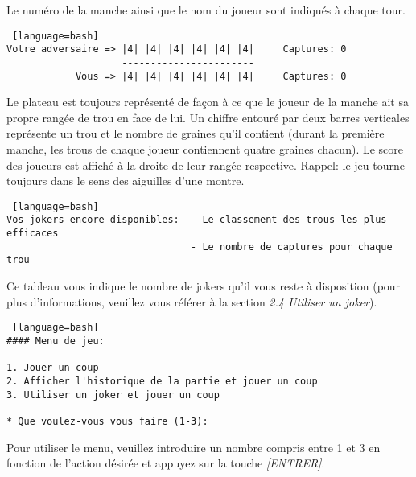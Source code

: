 \documentclass[11pt,a4paper]{report}
\begin{document}
            \begin{flushleft}
            Le numéro de la manche ainsi que le nom du joueur sont indiqués à chaque tour.
            \end{flushleft}

\begin{lstlisting} [language=bash]
Votre adversaire => |4| |4| |4| |4| |4| |4|     Captures: 0
                    -----------------------
            Vous => |4| |4| |4| |4| |4| |4|     Captures: 0
\end{lstlisting}

            \begin{flushleft}
            Le plateau est toujours représenté de façon à ce que le joueur de la manche ait sa propre rangée de trou en face de lui. Un chiffre entouré par deux barres verticales représente un trou et le nombre de graines qu'il contient (durant la première manche, les trous de chaque joueur contiennent quatre graines chacun). Le score des joueurs est affiché à la droite de leur rangée respective.\newline
            \underline{Rappel:} le jeu tourne toujours dans le sens des aiguilles d’une montre.
            \end{flushleft}

\begin{lstlisting} [language=bash]
Vos jokers encore disponibles:  - Le classement des trous les plus efficaces
                                - Le nombre de captures pour chaque trou
\end{lstlisting}

            \begin{flushleft}
                Ce tableau vous indique le nombre de jokers qu’il vous reste à disposition (pour plus d’informations, veuillez vous référer à la section \textit{2.4 Utiliser un joker}).
            \end{flushleft}

\begin{lstlisting} [language=bash]
#### Menu de jeu:

1. Jouer un coup
2. Afficher l'historique de la partie et jouer un coup
3. Utiliser un joker et jouer un coup

* Que voulez-vous vous faire (1-3):
\end{lstlisting}

            \begin{flushleft}
                Pour utiliser le menu, veuillez introduire un nombre compris entre 1 et 3 en fonction de l’action désirée et appuyez sur la touche \textit{[ENTRER]}.
            \end{flushleft}
\end{document}
